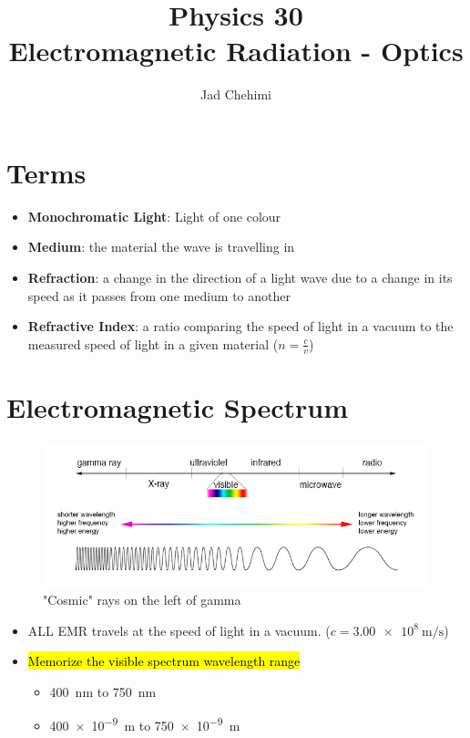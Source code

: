\documentclass[a4paper,12pt]{article}
\title{Physics 30 \\ Electromagnetic Radiation - Optics}
\author{Jad Chehimi}
\begin{document}
\maketitle
\tableofcontents

\pagebreak

\section{Terms}
\begin{itemize}
    \item{\textbf{Monochromatic Light}: Light of one colour}
    \item{\textbf{Medium}: the material the wave is travelling in}
    \item{\textbf{Refraction}: a change in the direction of a light wave due to a change in its speed as it passes from one medium to another}
    \item{\textbf{Refractive Index}: a ratio comparing the speed of light in a vacuum to the measured speed of light in a given material ($n = \frac{c}{v}$)}
\end{itemize}

\section{Electromagnetic Spectrum}
\begin{figure}[H]
    \centering
    \caption{"Cosmic" rays on the left of gamma}
    \includegraphics[width=\textwidth]{emr}
\end{figure}
\begin{itemize}
    \item{ALL EMR travels at the speed of light in a vacuum. ($c = \SI{3.00e8}{\m\per\s}$)}
    \item{
        \hl{Memorize the visible spectrum wavelength range}
        \begin{itemize}
            \item{\SI{400}{\nano\m} to \SI{750}{\nano\m}}
            \item{\SI{400e-9}{\m} to \SI{750e-9}{\m}}
        \end{itemize}
    }
\end{itemize}
\end{document}
